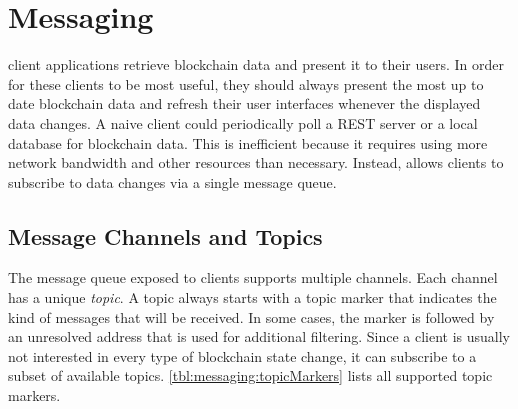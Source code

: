 \section{Messaging}
\label{sec:messaging}

\newcommand{\nemmemoryaddresstopic}[1]{
	\begin{leftwordgroup}{\texttt{topic part}}
		\bitbox{1}{\texttt{\small #1}} \bitbox[tlr]{7}{}
	\end{leftwordgroup} \\
	\wordbox[lr]{2}{Address (unresolved)} \\
	\bitbox[blr]{2}{} \bitbox[t]{6}{}
}


 client applications retrieve blockchain data and present it to their users.
In order for these clients to be most useful, they should always present the most up to date blockchain data and refresh their user interfaces whenever the displayed data changes.
A naive client could periodically poll a REST server or a local database for blockchain data.
This is inefficient because it requires using more network bandwidth and other resources than necessary.
Instead, \codenamespace allows clients to subscribe to data changes via a single message queue.

\subsection{Message Channels and Topics}
\label{sec:messaging:channels}

The \codenamespace message queue exposed to clients supports multiple channels.
Each channel has a unique \emph{topic}.
A topic always starts with a topic marker that indicates the kind of messages that will be received.
In some cases, the marker is followed by an unresolved address that is used for additional filtering.
Since a client is usually not interested in every type of blockchain state change, it can subscribe to a subset of available topics.
\autoref{tbl:messaging:topicMarkers} lists all supported topic markers.

